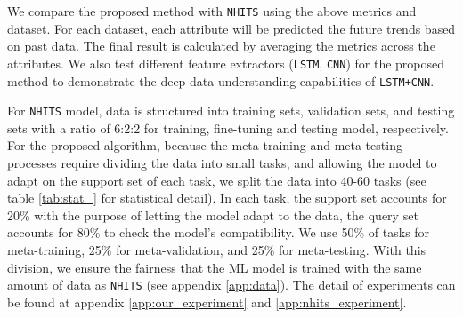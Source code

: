 \documentclass[aps,prb,groupedaddress,twocolumn,showpacs,dvipdfmx,superscriptaddress,pdftex]{revtex4-2}
\begin{document}

We compare the proposed method with \verb|NHITS| using the above metrics and dataset. For each dataset, each attribute will be predicted the future trends based on past data. The final result is calculated by averaging the metrics across the attributes. We also test different feature extractors (\verb|LSTM|, \verb|CNN|) for the proposed method to demonstrate the deep data understanding capabilities of \verb|LSTM+CNN|.

\vspace{2mm}

For \verb|NHITS| model, data is structured into training sets, validation sets, and testing sets with a ratio of 6:2:2 for training, fine-tuning and testing model, respectively. For the proposed algorithm, because the meta-training and meta-testing processes require dividing the data into small tasks, and allowing the model to adapt on the support set of each task, we split the data into 40-60 tasks (see table \ref{tab:stat_} for statistical detail). In each task, the support set accounts for 20\% with the purpose of letting the model adapt to the data, the query set accounts for 80\% to check the model's compatibility. We use 50\% of tasks for meta-training, 25\% for meta-validation, and 25\% for meta-testing. With this division, we ensure the fairness that the ML model is trained with the same amount of data as \verb|NHITS| (see appendix \ref{app:data}). The detail of experiments can be found at appendix \ref{app:our_experiment} and \ref{app:nhits_experiment}.
\end{document}
